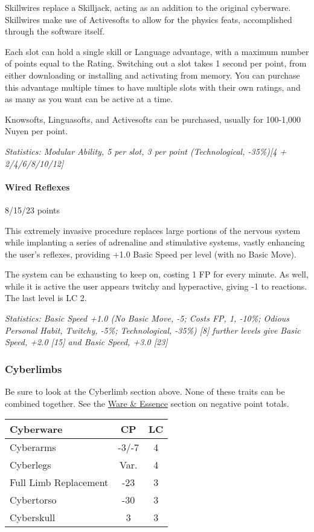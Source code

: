 \begin{multicols*}{3}
	Skillwires replace a Skilljack, acting as an addition to the original cyberware. Skillwires make use of Activesofts to allow for the physics feats, accomplished through the software itself. 
	
	Each slot can hold a single skill or Language advantage, with a maximum number of points equal to the Rating. Switching out a slot takes 1 second per point, from either downloading or installing and activating from memory. You can purchase this advantage multiple times to have multiple slots with their own ratings, and as many as you want can be active at a time.
	
	Knowsofts, Linguasofts, and Activesofts can be purchased, usually for 100-1,000 Nuyen per point.
	
	\textit{\textcolor{OliveGreen}{Statistics: Modular Ability, 5 per slot, 3 per point (Technological, -35\%)[4 + 2/4/6/8/10/12]}}
	
	\paragraph{Wired Reflexes}
	\begin{flushright}
		8/15/23 points
	\end{flushright}
	
	This extremely invasive procedure replaces large portions of the nervous system while implanting a series of adrenaline and stimulative systems, vastly enhancing the user's reflexes, providing +1.0 Basic Speed per level (with no Basic Move).
	
	The system can be exhausting to keep on, costing 1 FP for every minute. As well, while it is active the user appears twitchy and hyperactive, giving -1 to reactions. The last level is LC 2.
	
	\textit{\textcolor{OliveGreen}{Statistics: Basic Speed +1.0 (No Basic Move, -5; Costs FP, 1, -10\%; Odious Personal Habit, Twitchy, -5\%; Technological, -35\%) [8] further levels give Basic Speed, +2.0 [15] and Basic Speed, +3.0 [23]}}
	
	\subsubsection{Cyberlimbs}
	
	Be sure to look at the Cyberlimb section above. None of these traits can be combined together. See the \hyperref[ware]{Ware \& Essence} section on negative point totals.
	
	\begin{center}
		\begin{tabularx}{0.32\textwidth}{|X|c|c|}
			\hline
			Cyberware & CP & LC\\
			\hline
			\hline
			Cyberarms & -3/-7 & 4 \\
			Cyberlegs & Var. & 4 \\
			Full Limb Replacement & -23 & 3 \\
			Cybertorso & -30 & 3 \\
			Cyberskull & 3 & 3 \\
			\hline
		\end{tabularx}
	\end{center}
	

\end{multicols*}
